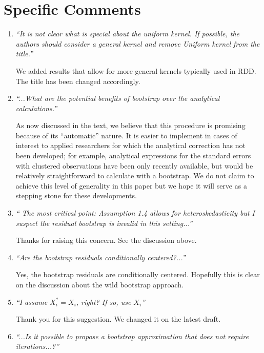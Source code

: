 \documentclass[12pt,fleqn]{article}
\begin{document}
\section{Specific Comments}

\begin{enumerate}
 \item  \textit{``It is not clear what is special about the uniform kernel. If possible, the authors should consider a general kernel and remove Uniform kernel from the title.''}

 We added results that allow for more general kernels typically used in RDD. The title has been changed accordingly.

\item \textit{``...What are the potential benefits of bootstrap over the analytical calculations.''}

  As now discussed in the text, we believe that this procedure is promising
  because of its ``automatic'' nature. It is easier to implement in cases of
  interest to applied researchers for which the analytical correction has not
  been developed; for example, analytical expressions for the standard errors
  with clustered observations have been only recently available, but would be
  relatively straightforward to calculate with a bootstrap.  We do not claim to
  achieve this level of generality in this paper but we hope it will serve as a
  stepping stone for these developments.

\item \textit{`` The most critical point: Assumption 1.4 allows for heteroskedasticity but I suspect the residual bootstrap is invalid in this setting...''}

Thanks for raising this concern. See the discussion above.

\item \textit{``Are the bootstrap residuals conditionally centered?...''}

 Yes, the bootstrap residuals are conditionally centered. Hopefully this is clear on the discussion about the wild bootstrap approach.

\item \textit{``I assume $X_{i}^{*}=X_{i}$, right? If so, use $X_{i}$''}

Thank you for this suggestion. We changed it on the latest draft.

\item \textit{``...Is it possible to propose a bootstrap approximation that does not require iterations...?''}


\end{enumerate}
\end{document}

